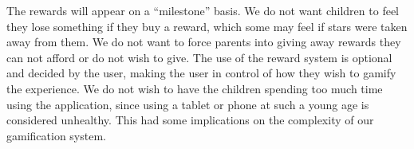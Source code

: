 The rewards will appear on a ``milestone'' basis. We do not want children to feel they lose something if they buy a reward, which some may feel if stars were taken away from them. We do not want to force parents into giving away rewards they can not afford or do not wish to give. The use of the reward system is optional and decided by the user, making the user in control of how they wish to gamify the experience. 
We do not wish to have the children spending too much time using the application, since using a tablet or phone at such a young age is considered unhealthy. This had some implications on the complexity of our gamification system. 

